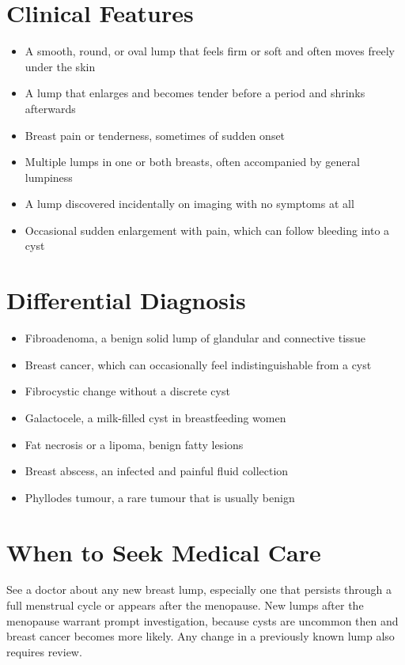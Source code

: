 \section*{Clinical Features}
\begin{itemize}
    \item A smooth, round, or oval lump that feels firm or soft and often moves freely under the skin
    \item A lump that enlarges and becomes tender before a period and shrinks afterwards
    \item Breast pain or tenderness, sometimes of sudden onset
    \item Multiple lumps in one or both breasts, often accompanied by general lumpiness
    \item A lump discovered incidentally on imaging with no symptoms at all
    \item Occasional sudden enlargement with pain, which can follow bleeding into a cyst
\end{itemize}

\section*{Differential Diagnosis}
\begin{itemize}
    \item Fibroadenoma, a benign solid lump of glandular and connective tissue
    \item Breast cancer, which can occasionally feel indistinguishable from a cyst
    \item Fibrocystic change without a discrete cyst
    \item Galactocele, a milk-filled cyst in breastfeeding women
    \item Fat necrosis or a lipoma, benign fatty lesions
    \item Breast abscess, an infected and painful fluid collection
    \item Phyllodes tumour, a rare tumour that is usually benign
\end{itemize}

\section*{When to Seek Medical Care}
See a doctor about any new breast lump, especially one that persists through a full menstrual cycle or appears after the menopause. New lumps after the menopause warrant prompt investigation, because cysts are uncommon then and breast cancer becomes more likely. Any change in a previously known lump also requires review.

